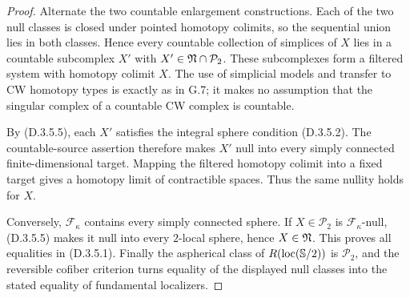 \begin{proof}
Alternate the two countable enlargement constructions.
Each of the two null classes is closed under pointed
homotopy colimits, so the sequential union lies in both
classes. Hence every countable collection of simplices
of $X$ lies in a countable subcomplex $X'$ with
$X'\in\mathfrak N\cap\mathcal P_2$. These subcomplexes form
a filtered system with homotopy colimit $X$. The use of
simplicial models and transfer to CW homotopy types is
exactly as in G.7; it makes no assumption that the
singular complex of a countable CW complex is countable.

By (D.3.5.5), each $X'$ satisfies the integral sphere
condition (D.3.5.2). The countable-source assertion
therefore makes $X'$ null into every simply connected
finite-dimensional target. Mapping the filtered homotopy
colimit into a fixed target gives a homotopy limit of
contractible spaces. Thus the same nullity holds for $X$.

Conversely, $\mathcal F_\kappa$ contains every simply
connected sphere. If $X\in\mathcal P_2$ is
$\mathcal F_\kappa$-null, (D.3.5.5) makes it null into
every $2$-local sphere, hence $X\in\mathfrak N$. This proves
all equalities in (D.3.5.1). Finally the aspherical class
of $R(\operatorname{loc}(\mathbb S/2))$ is $\mathcal P_2$, and the
reversible cofiber criterion turns equality of the
displayed null classes into the stated equality of
fundamental localizers.
\end{proof}
